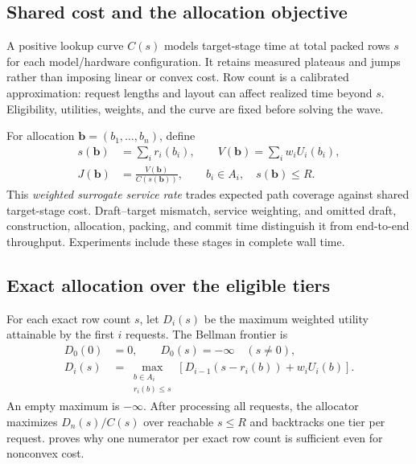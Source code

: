 \documentclass{article}
\begin{document}
\subsection{Shared cost and the allocation objective}
\label{sec:objective}
A positive lookup curve $C(s)$ models target-stage time at total packed rows $s$ for each model/hardware configuration. It retains measured plateaus and jumps rather than imposing linear or convex cost. Row count is a calibrated approximation: request lengths and layout can affect realized time beyond $s$. Eligibility, utilities, weights, and the curve are fixed before solving the wave.

For allocation $\boldsymbol b=(b_1,\ldots,b_n)$, define
\begin{equation}
\begin{split}
s(\boldsymbol b)&=\sum_i r_i(b_i),\qquad
V(\boldsymbol b)=\sum_i w_iU_i(b_i),\\
J(\boldsymbol b)&=\frac{V(\boldsymbol b)}{C(s(\boldsymbol b))},
\qquad b_i\in A_i,\quad s(\boldsymbol b)\le R.
\end{split}
\label{eq:objective}
\end{equation}
This \emph{weighted surrogate service rate} trades expected path coverage against shared target-stage cost. Draft--target mismatch, service weighting, and omitted draft, construction, allocation, packing, and commit time distinguish it from end-to-end throughput. Experiments include these stages in complete wall time.

\subsection{Exact allocation over the eligible tiers}
\label{sec:allocator}
For each exact row count $s$, let $D_i(s)$ be the maximum weighted utility attainable by the first $i$ requests. The Bellman frontier is
\begin{equation}
\begin{split}
D_0(0)&=0,\qquad D_0(s)=-\infty\quad(s\ne0),\\
D_i(s)&=\max_{\substack{b\in A_i\\r_i(b)\le s}}
\left[D_{i-1}(s-r_i(b))+w_iU_i(b)\right].
\end{split}
\label{eq:dp}
\end{equation}
An empty maximum is $-\infty$. After processing all requests, the allocator maximizes $D_n(s)/C(s)$ over reachable $s\le R$ and backtracks one tier per request.  proves why one numerator per exact row count is sufficient even for nonconvex cost.
\end{document}
